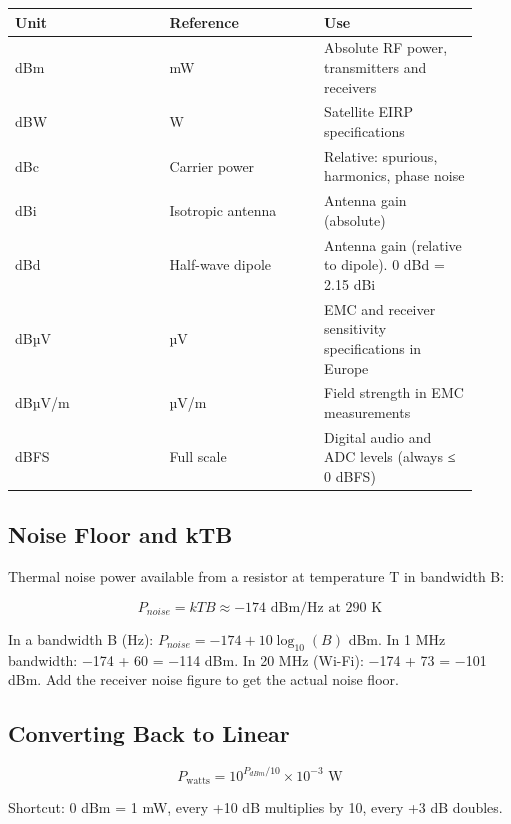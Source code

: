         
        
        
        
        
        
        
        
      

{\small\begin{longtable}{>{\raggedright\arraybackslash}p{0.307\linewidth}>{\raggedright\arraybackslash}p{0.307\linewidth}>{\raggedright\arraybackslash}p{0.307\linewidth}}
\hline
\textbf{Unit} & \textbf{Reference} & \textbf{Use} \\
\hline
dBm & 1 mW & Absolute RF power, transmitters and receivers \\
dBW & 1 W & Satellite EIRP specifications \\
dBc & Carrier power & Relative: spurious, harmonics, phase noise \\
dBi & Isotropic antenna & Antenna gain (absolute) \\
dBd & Half-wave dipole & Antenna gain (relative to dipole). 0 dBd = 2.15 dBi \\
dBµV & 1 µV & EMC and receiver sensitivity specifications in Europe \\
dBµV/m & 1 µV/m & Field strength in EMC measurements \\
dBFS & Full scale & Digital audio and ADC levels (always ≤ 0 dBFS) \\
\hline
\end{longtable}}

      

\subsection{Noise Floor and kTB}

      

Thermal noise power available from a resistor at temperature T in bandwidth B:

      
\[P_{noise} = kTB \approx -174\text{ dBm/Hz at } 290\text{ K}\]

      

In a bandwidth B (Hz): $P_{noise} = -174 + 10\log_{10}(B)$ dBm. In 1 MHz bandwidth: −174 + 60 = −114 dBm. In 20 MHz (Wi-Fi): −174 + 73 = −101 dBm. Add the receiver noise figure to get the actual noise floor.

      

\subsection{Converting Back to Linear}

      
\[P_{\text{watts}} = 10^{P_{dBm}/10} \times 10^{-3}\text{ W}\]

      

Shortcut: 0 dBm = 1 mW, every +10 dB multiplies by 10, every +3 dB doubles.



